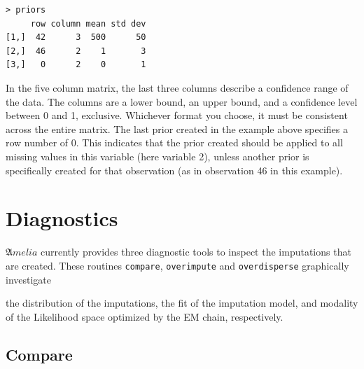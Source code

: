 \documentclass[12pt,titlepage]{article}
\newcommand{\Amelia}{\ensuremath{\mathfrak Amelia} }
\begin{document}
\begin{verbatim}
> priors
     row column mean std dev
[1,]  42      3  500      50
[2,]  46      2    1       3
[3,]   0      2    0       1
\end{verbatim}


In the five column matrix, the last three columns describe a confidence range of
the data. The columns are a lower bound, an upper bound, and a confidence
level between 0 and 1, exclusive.  Whichever format you choose, it must be
consistent across the entire matrix.  The last prior created in the example above specifies a row number of 0.  This indicates that the prior created should be applied to all missing values in this variable (here variable 2), unless another prior is specifically created for that observation (as in observation 46 in this example).

\section{Diagnostics}\label{sec:diag}

\Amelia currently provides three diagnostic tools to inspect the
imputations that are created.  These routines \texttt{compare},
\texttt{overimpute} and \texttt{overdisperse} graphically investigate

the distribution of the imputations, the fit of the imputation model,
and modality of the Likelihood space optimized by the EM chain,
respectively.

\subsection{Compare}
\end{document}
